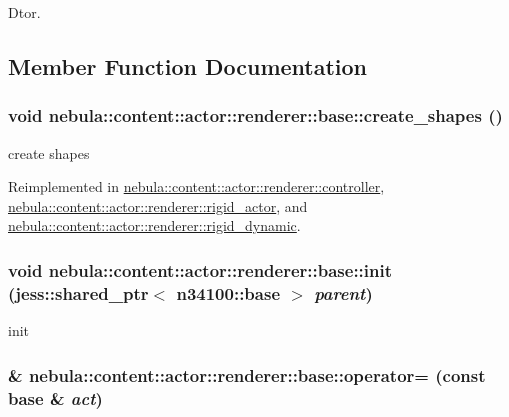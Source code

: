 Dtor. 

\subsection{Member Function Documentation}
\hypertarget{classnebula_1_1content_1_1actor_1_1renderer_1_1base_a7a8ac733753c32792feb02a89d87a0d0}{
\subsubsection[{create\_\-shapes}]{\setlength{\rightskip}{0pt plus 5cm}void nebula::content::actor::renderer::base::create\_\-shapes ()}}
\label{classnebula_1_1content_1_1actor_1_1renderer_1_1base_a7a8ac733753c32792feb02a89d87a0d0}


create shapes 

Reimplemented in \hyperlink{classnebula_1_1content_1_1actor_1_1renderer_1_1controller_a5e6389f688c55cc3209bb3081dda286c}{nebula::content::actor::renderer::controller}, \hyperlink{classnebula_1_1content_1_1actor_1_1renderer_1_1rigid__actor_a1f1c2c451ac3c5cf9bd67e7e15f3df5f}{nebula::content::actor::renderer::rigid\_\-actor}, and \hyperlink{classnebula_1_1content_1_1actor_1_1renderer_1_1rigid__dynamic_adb6f10e76d5854f424b7e44db595f4b7}{nebula::content::actor::renderer::rigid\_\-dynamic}.\hypertarget{classnebula_1_1content_1_1actor_1_1renderer_1_1base_a6fd2c3cd9b8c7ec07acc4ebee6847303}{
\subsubsection[{init}]{\setlength{\rightskip}{0pt plus 5cm}void nebula::content::actor::renderer::base::init (jess::shared\_\-ptr$<$ {\bf n34100::base} $>$ {\em parent})}}
\label{classnebula_1_1content_1_1actor_1_1renderer_1_1base_a6fd2c3cd9b8c7ec07acc4ebee6847303}


init \hypertarget{classnebula_1_1content_1_1actor_1_1renderer_1_1base_a8cb55e87ac866ad14c7e1d03077681a9}{
\subsubsection[{operator=}]{ \& nebula::content::actor::renderer::base::operator= (const {\bf base} \& {\em act})}}
\label{classnebula_1_1content_1_1actor_1_1renderer_1_1base_a8cb55e87ac866ad14c7e1d03077681a9}


